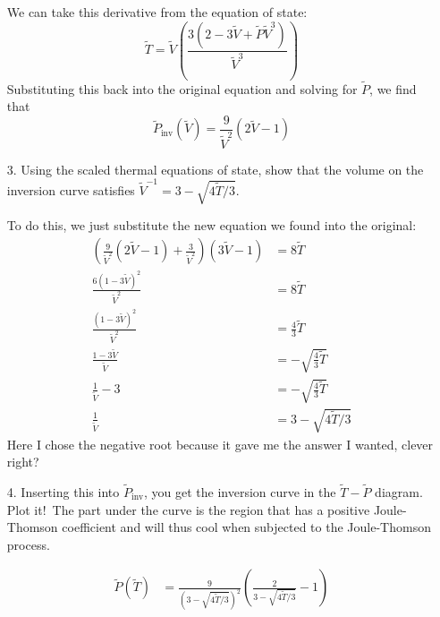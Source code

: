 \documentclass[a4paper,twoside]{article}
\begin{document}
\begin{itemize}
\begin{problem}
\begin{equation}
            \end{equation}
            We can take this derivative from the equation of state:
            \begin{equation}
                \tilde{T}= \tilde{V}\left( \frac{3(2-3\tilde{V}+\tilde{P}\tilde{V}^3)}{\tilde{V}^3} \right)
            \end{equation}
            Substituting this back into the original equation and solving for $ \tilde{P} $, we find that
            \begin{equation}
                \tilde{P}_{\text{inv}}(\tilde{V}) = \frac{9}{\tilde{V}^2} (2 \tilde{V}-1)
            \end{equation}
        \end{problem}
    \item[3.] Using the scaled thermal equations of state, show that the volume on the inversion curve satisfies $ \tilde{V}^{-1} = 3 - \sqrt{4\tilde{T}/3} $.
        \begin{problem}
            To do this, we just substitute the new equation we found into the original:
            \begin{align}
                \left( \frac{9}{\tilde{V}^2} (2\tilde{V} - 1) + \frac{3}{\tilde{V}^2} \right)(3\tilde{V} - 1) &= 8\tilde{T} \\
                \frac{6(1-3\tilde{V})^2}{\tilde{V}^2} &= 8\tilde{T} \\
                \frac{(1-3\tilde{V})^2}{\tilde{V}^2} &= \frac{4}{3} \tilde{T} \\
                \frac{1-3\tilde{V}}{\tilde{V}} &= - \sqrt{\frac{4}{3} \tilde{T}} \\
                \frac{1}{\tilde{V}} - 3 &= - \sqrt{\frac{4}{3} \tilde{T}} \\
                \frac{1}{\tilde{V}} &= 3 - \sqrt{4\tilde{T}/3}
            \end{align}
            Here I chose the negative root because it gave me the answer I wanted, clever right?
        \end{problem}
    \item[4.] Inserting this into $ \tilde{P}_{\text{inv}} $, you get the inversion curve in the $\tilde{T}-\tilde{P}$ diagram. Plot it!\ The part under the curve is the region that has a positive Joule-Thomson coefficient and will thus cool when subjected to the Joule-Thomson process.
        \begin{problem}
            \begin{align}
                \tilde{P}(\tilde{T}) &= \frac{9}{\left( 3- \sqrt{4\tilde{T}/3} \right)^2} \left( \frac{2}{3- \sqrt{4\tilde{T}/3}} - 1 \right) \\

\end{align}
\end{problem}
\end{itemize}
\end{document}
